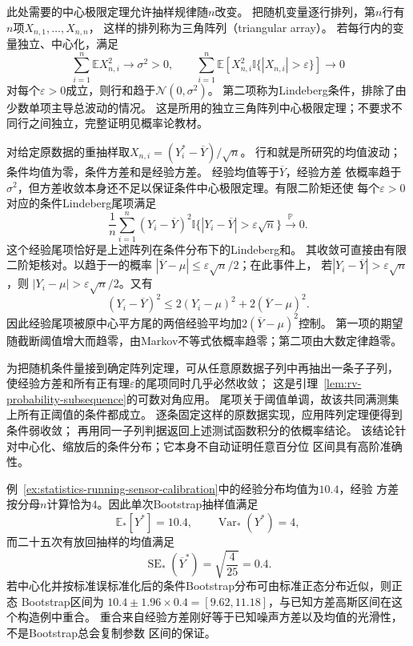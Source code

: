 此处需要的中心极限定理允许抽样规律随\(n\)改变。
把随机变量逐行排列，第\(n\)行有\(n\)项\(X_{n,1},\ldots,X_{n,n}\)，
这样的排列称为三角阵列（triangular array）。
若每行内的变量独立、中心化，满足
\[
 \sum_{i=1}^n\mathbb E X_{n,i}^2\longrightarrow\sigma^2>0,\qquad
 \sum_{i=1}^n\mathbb E\!\left[
 X_{n,i}^2\mathbb I\{|X_{n,i}|>\varepsilon\}\right]\longrightarrow0
\]
对每个\(\varepsilon>0\)成立，则行和趋于\(\mathcal N(0,\sigma^2)\)。
第二项称为Lindeberg条件，排除了由少数单项主导总波动的情况。
这是所用的独立三角阵列中心极限定理；不要求不同行之间独立，完整证明见概率论教材。

对给定原数据的重抽样取\(X_{n,i}=(Y_i^\ast-\overline Y)/\sqrt n\)。
行和就是所研究的均值波动；条件均值为零，条件方差和是经验方差。
经验均值等于\(\overline Y\)，经验方差
依概率趋于\(\sigma^2\)，但方差收敛本身还不足以保证条件中心极限定理。有限二阶矩还使
每个\(\varepsilon>0\)对应的条件Lindeberg尾项满足
\[
  \frac1n\sum_{i=1}^n(Y_i-\overline Y)^2
  \mathbb I\{|Y_i-\overline Y|>\varepsilon\sqrt n\}
  \xrightarrow{\mathbb P}0.
\]
这个经验尾项恰好是上述阵列在条件分布下的Lindeberg和。
其收敛可直接由有限二阶矩核对。以趋于一的概率
\(|\overline Y-\mu|\leq\varepsilon\sqrt n/2\)；在此事件上，
若\(|Y_i-\overline Y|>\varepsilon\sqrt n\)，则
\(|Y_i-\mu|>\varepsilon\sqrt n/2\)。又有
\[
 (Y_i-\overline Y)^2\leq2(Y_i-\mu)^2+2(\overline Y-\mu)^2.
\]
因此经验尾项被原中心平方尾的两倍经验平均加\(2(\overline Y-\mu)^2\)控制。
第一项的期望随截断阈值增大而趋零，由Markov不等式依概率趋零；第二项由大数定律趋零。

为把随机条件量接到确定阵列定理，可从任意原数据子列中再抽出一条子子列，
使经验方差和所有正有理\(\varepsilon\)的尾项同时几乎必然收敛；
这是引理~\ref{lem:rv-probability-subsequence}的可数对角应用。
尾项关于阈值单调，故该共同满测集上所有正阈值的条件都成立。
逐条固定这样的原数据实现，应用阵列定理便得到条件弱收敛；
再用同一子列判据返回上述测试函数积分的依概率结论。
该结论针对中心化、缩放后的条件分布；它本身不自动证明任意百分位
区间具有高阶准确性。

例~\ref{ex:statistics-running-sensor-calibration}中的经验分布均值为\(10.4\)，经验
方差按分母\(n\)计算恰为\(4\)。因此单次Bootstrap抽样值满足
\[
  \mathbb{E}_\ast[Y^\ast]=10.4,\qquad
  \operatorname{Var}_\ast(Y^\ast)=4,
\]
而二十五次有放回抽样的均值满足
\[
  \operatorname{SE}_\ast(\overline Y^\ast)
  =
  \sqrt{\frac4{25}}=0.4.
\]
若中心化并按标准误标准化后的条件Bootstrap分布可由标准正态分布近似，则正态
Bootstrap区间为
\(10.4\pm1.96\times0.4=[9.62,11.18]\)，与已知方差高斯区间在这个构造例中重合。
重合来自经验方差刚好等于已知噪声方差以及均值的光滑性，不是Bootstrap总会复制参数
区间的保证。

